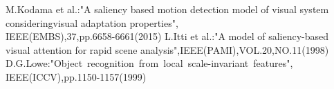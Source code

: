 \vspace{-4.0mm}
\begin{thebibliography}{}
\vspace{-1.5mm}
\scriptsize{
M.Kodama et al.:"A saliency based motion detection model of visual system consideringvisual adaptation properties",\\IEEE(EMBS),37,pp.6658-6661(2015)
L.Itti et al.:"A model of saliency-based visual attention for rapid scene analysis",IEEE(PAMI),VOL.20,NO.11(1998)
D.G.Lowe:"Object~recognition~from~local~scale-invariant~features",\\IEEE(ICCV),pp.1150-1157(1999)
}
\end{thebibliography}
